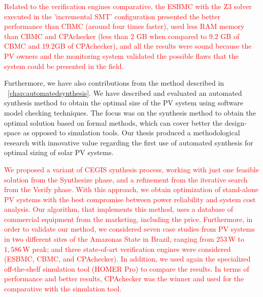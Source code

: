 %
\textcolor{red}{Related to the verification engines comparative, the ESBMC with the Z3 solver executed in the 'incremental SMT' configuration presented the better performance than CBMC (around four times faster), used less RAM memory than CBMC and CPAchecker (less than $2$ GB when compared to $9.2$ GB of CBMC and 19.2GB of CPAchecker), and all the results were sound because the PV owners and the monitoring system validated the possible flaws that the system could be presented in the field.}

Furthermore, we have also contributions from the method described in ~\autoref{chap:automatedsynthesis}. We have described and evaluated an automated synthesis method to obtain the optimal size of the PV system using software model checking techniques. The focus was on the synthesis method to obtain the optimal solution based on formal methods, which can cover better the design-space as opposed to simulation tools. Our thesis produced a methodological research with innovative value regarding the first use of automated synthesis for optimal sizing of solar PV systems.

\textcolor{red}{We proposed a variant of CEGIS synthesis process, working with just one feasible solution from the {\sc Synthesize} phase, and a refinement from the iterative search from the {\sc Verify} phase. With this approach, we obtain optimization of stand-alone PV systems with the best compromise between power reliability and system cost analysis. Our algorithm, that implements this method, uses a database of commercial equipment from the marketing, including the price. Furthermore, in order to validate our method, we considered seven case studies from PV systems in two different sites of the Amazonas State in Brazil, ranging from $253$\,W to $1,586$\,W peak; and three state-of-art verification engines were considered (ESBMC, CBMC, and CPAchecker). In addition, we used again the specialized off-the-shelf simulation tool (HOMER Pro) to compare the results. In terms of performance and better results, CPAchecker was the winner and used for the comparative with the simulation tool. }

